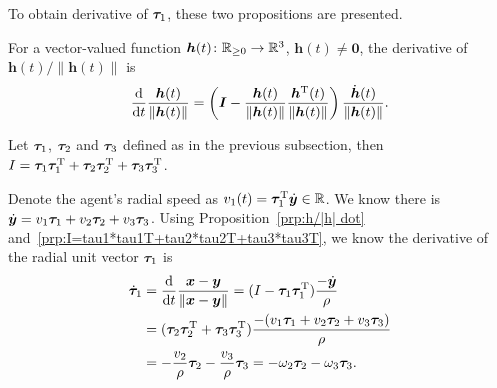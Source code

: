 \documentclass[5p,authoryear,preprint]{elsarticle}\linenofalse
\begin{document}
To obtain derivative of $\bm{\tau}_1$, these two propositions are presented.

\begin{proposition}\label{prp:h/|h| dot=?}
For a vector-valued function $\bm h(t)\colon\mathbb{R}_{\ge0}\to\mathbb{R}^3$, $\bm h(t)\ne\bm0$, the derivative of $\bm h(t)/\|\bm h(t)\|$ is
\[
\frac{\mathrm d}{\mathrm dt}\frac{\bm h(t)}{\|\bm h(t)\|}=\left(\bm I-\frac{\bm h(t)}{\|\bm h(t)\|}\frac{\bm h^{\mathrm{T}}(t)}{\|\bm h(t)\|}\right)\frac{\dot{\bm h}(t)}{\|\bm h(t)\|}.
\]
\end{proposition}

\begin{proposition}\label{prp:I=tau1*tau1T+tau2*tau2T+tau3*tau3T}
Let $\bm{\tau}_1$, $\bm{\tau}_2$ and $\bm{\tau}_3$ defined as in the previous subsection, then
$I=\bm{\tau}_1\bm{\tau}_1^\mathrm{T}+\bm{\tau}_2\bm{\tau}_2^\mathrm{T}+\bm{\tau}_3\bm{\tau}_3^\mathrm{T}$.
\end{proposition}

Denote the agent's radial speed as $v_1(t)=\bm{\tau}_1^\mathrm{T}\dot{\bm{y}}\in\mathbb{R}$.
We know there is $\dot{\bm{y}}=v_1\bm{\tau}_1+v_2\bm{\tau}_2+v_3\bm{\tau}_3$.
Using Proposition~\ref{prp:h/|h| dot} and~\ref{prp:I=tau1*tau1T+tau2*tau2T+tau3*tau3T}, we know the derivative of the radial unit vector $\bm{\tau}_1$ is
\begin{equation}\label{eqn:tau1 dot=?}
\begin{aligned}
	\dot{\bm{\tau}}_1&=\frac{\mathrm d}{\mathrm dt}\frac{\bm{x}-\bm{y}}{\|\bm{x}-\bm{y}\|}=(I-\bm{\tau}_1\bm{\tau}_1^\mathrm{T})\frac{-\dot{\bm{y}}}\rho\\
	&=(\bm{\tau}_2\bm{\tau}_2^\mathrm{T}+\bm{\tau}_3\bm{\tau}_3^\mathrm{T})\frac{-(v_1\bm{\tau}_1+v_2\bm{\tau}_2+v_3\bm{\tau}_3)}\rho\\
	&=-\frac{v_2}\rho\bm{\tau}_2-\frac{v_3}\rho\bm{\tau}_3=-\omega_2\bm{\tau}_2-\omega_3\bm{\tau}_3.
\end{aligned}\end{equation}
\end{document}
